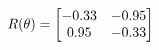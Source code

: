 \documentclass[preview]{standalone}
\begin{document}
\begin{align*}
\special{dvisvgm:raw <g id='unique000'>}R(\theta) = \begin{bmatrix}-0.33 & -0.95\\0.95 & -0.33\end{bmatrix}\special{dvisvgm:raw </g>}
\end{align*}
\end{document}
